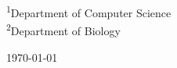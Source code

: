 \begin{titlepage}
	
	\begin{figure}[b]
		\begin{minipage}{0.55\textwidth}
			\begin{flushleft}
				\textsuperscript{1}Department of Computer Science\\
				\textsuperscript{2}Department of Biology
			\end{flushleft}
		\end{minipage}
		\hfill
		\begin{minipage}{0.35\textwidth}
			\begin{flushright}
				\textsc{\today}
			\end{flushright}
		\end{minipage}
		
	\end{figure}

\end{titlepage}
